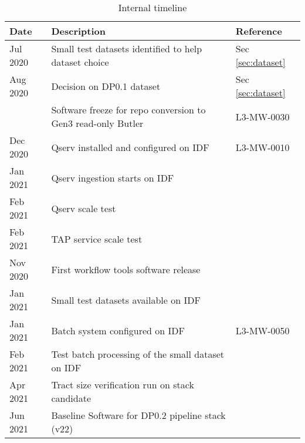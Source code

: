 \tiny \begin{longtable} {|l|l|l|} \caption{Internal timeline   \label{tab:timeline}}\\
\hline
\textbf{Date}&\textbf{Description}&\textbf{Reference}  \\ \hline

{Jul 2020}&{Small test datasets identified to help dataset choice}&{Sec \ref{sec:dataset}} \\ \hline
{Aug 2020}&{Decision on DP0.1 dataset}&{Sec \ref{sec:dataset}} \\ \hline
{}&{Software freeze for repo conversion to Gen3 read-only Butler}&{L3-MW-0030} \\ \hline
{Dec 2020}&{Qserv installed and configured on IDF}&{L3-MW-0010} \\ \hline
{Jan 2021}&{Qserv ingestion starts on IDF}&{} \\ \hline
{Feb 2021}&{Qserv scale test}&{} \\ \hline
{Feb 2021}&{TAP service scale test}&{} \\ \hline
{Nov 2020}&{First workflow tools software release}&{} \\ \hline
{Jan 2021}&{Small test datasets available on IDF}&{} \\ \hline
{Jan 2021}&{Batch system configured on IDF}&{L3-MW-0050} \\ \hline
{Feb 2021}&{Test batch processing of the small dataset on IDF}&{} \\ \hline
{Apr 2021}&{Tract size verification run on stack candidate}&{} \\ \hline
{Jun 2021}&{Baseline Software for DP0.2 pipeline stack (v22)}&{} \\ \hline
\end{longtable} \normalsize

